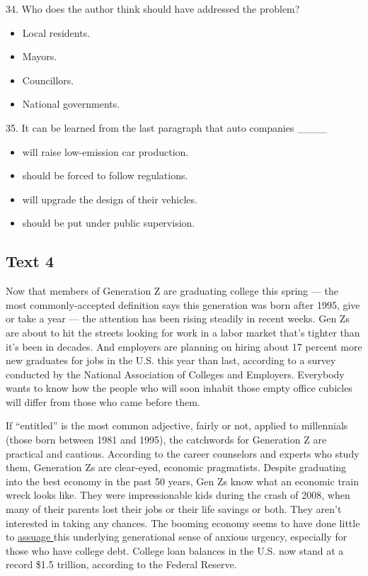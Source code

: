 \documentclass[UTF8,11pt]{ctexart}
\begin{document}
34. Who does the author think should have addressed the problem?


\begin{itemize}[leftmargin=2em,itemsep=.2em,topsep=.4em]\item[A.] Local residents.
\item[B.] Mayors.
\item[C.] Councillors.
\item[D.] National governments.
\end{itemize}

35. It can be learned from the last paragraph that auto companies \_\_\_\_


\begin{itemize}[leftmargin=2em,itemsep=.2em,topsep=.4em]\item[A.] will raise low-emission car production.
\item[B.] should be forced to follow regulations.
\item[C.] will upgrade the design of their vehicles.
\item[D.] should be put under public supervision.
\end{itemize}

\subsection*{\textbf{Text 4}}


Now that members of Generation Z are graduating college this spring — the most commonly-accepted definition says this generation was born after 1995, give or take a year — the attention has been rising steadily in recent weeks. Gen Zs are about to hit the streets looking for work in a labor market that’s tighter than it’s been in decades. And employers are planning on hiring about 17 percent more new graduates for jobs in the U.S. this year than last, according to a survey conducted by the National Association of Colleges and Employers. Everybody wants to know how the people who will soon inhabit those empty office cubicles will differ from those who came before them.


If “entitled” is the most common adjective, fairly or not, applied to millennials (those born between 1981 and 1995), the catchwords for Generation Z are practical and cautious. According to the career counselors and experts who study them, Generation Zs are clear-eyed, economic pragmatists. Despite graduating into the best economy in the past 50 years, Gen Zs know what an economic train wreck looks like. They were impressionable kids during the crash of 2008, when many of their parents lost their jobs or their life savings or both. They aren’t interested in taking any chances. The booming economy seems to have done little to \uline{assuage }this underlying generational sense of anxious urgency, especially for those who have college debt. College loan balances in the U.S. now stand at a record \$1.5 trillion, according to the Federal Reserve.
\end{document}

